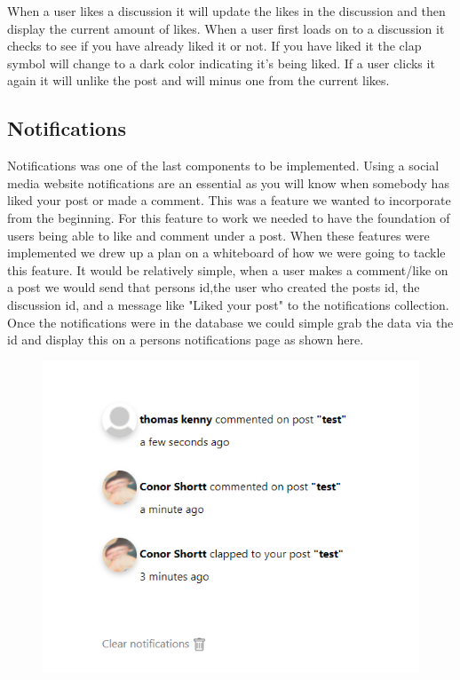 When a user likes a discussion it will update the likes in the discussion and then display the current amount of likes. When a user first loads on to a discussion it checks to see if you have already liked it or not. If you have liked it the clap symbol will change to a dark color indicating it's being liked. If a user clicks it again it will unlike the post and will minus one from the current likes.

\subsection{Notifications}
Notifications was one of the last components to be implemented. Using a social media website notifications are an essential as you will know when somebody has liked your post or made a comment. This was a feature we wanted to incorporate from the beginning. 
For this feature to work we needed to have the foundation of users being able to like and comment under a post. When these features were implemented we drew up a plan on a whiteboard of how we were going to tackle this feature. It would be relatively simple, when a user makes a comment/like on a post we would send that persons id,the user who created the posts id, the discussion id, and a message like "Liked your post" to the notifications collection. Once the notifications were in the database we could simple grab the data via the id and display this on a persons notifications page as shown here.
\begin{figure}[H]
  \centering
  \includegraphics[scale=0.55]{img/notifications.PNG}
  \label{fig:Notifications}
\end{figure}
